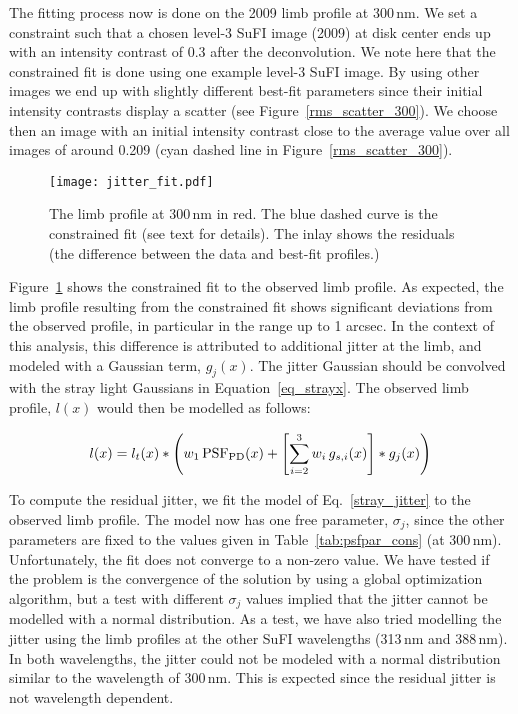 \documentclass[goettingen, gauss, print]{thesis}
\begin{document}
The fitting process now is done on the 2009 limb profile at 300\,nm. We set a constraint such that a chosen level-3 SuFI image (2009) at disk center ends up with an intensity contrast of 0.3 after the deconvolution. We note here that the constrained fit is done using one example level-3 SuFI image. By using other images we end up with slightly different best-fit parameters since their initial intensity contrasts display a scatter (see Figure~\ref{rms_scatter_300}). We choose then an image with an initial intensity contrast close to the average value over all images of around 0.209 (cyan dashed line in Figure~\ref{rms_scatter_300}). 

\begin{figure}
\centering
\texttt{[image: jitter\_fit.pdf]}
\caption{The limb profile at 300\,nm in red. The blue dashed curve is the constrained fit (see text for details). The inlay shows the residuals (the difference between the data and best-fit profiles.) }
\label{lousy_fit}
\end{figure}

Figure~\ref{lousy_fit} shows the constrained fit to the observed limb profile. As expected, the limb profile resulting from the constrained fit shows significant deviations from the observed profile, in particular in the range up to 1 arcsec. In the context of this analysis, this difference is attributed to additional jitter at the limb, and modeled with a Gaussian term, $g_{j}(x)$. The jitter Gaussian should be convolved with the stray light Gaussians in Equation~\ref{eq_strayx}. The observed limb profile, $l(x)$ would then be modelled as follows:

\begin{equation}
  l(x) = l_{t}(x) \ast  \left(w_{1} \, \mathrm{PSF}_{\mathrm{PD}}(x) + \left[\sum_{i=2}^{3} w_{i} \, g_{s,i}(x) \right] \ast g_{j}(x)\right) 
 \label{stray_jitter}
\end{equation} 

To compute the residual jitter, we fit the model of Eq.~\ref{stray_jitter} to the observed limb profile. The model now has one free parameter, $\sigma_j$, since the other parameters are fixed to the values given in Table~\ref{tab:psfpar_cons} (at 300\,nm). Unfortunately, the fit does not converge to a non-zero value. We have tested if the problem is the convergence of the solution by using a global optimization algorithm, but a test with different $\sigma_j$ values implied that the jitter cannot be modelled with a normal distribution. As a test, we have also tried modelling the jitter using the limb profiles at the other SuFI wavelengths (313\,nm and 388\,nm). In both wavelengths, the jitter could not be modeled with a normal distribution similar to the wavelength of 300\,nm. This is expected since the residual jitter is not wavelength dependent.
\end{document}
